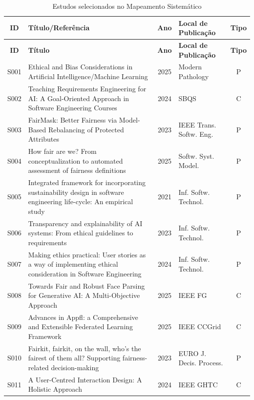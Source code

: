 \begin{longtable}
{|c|p{8cm}|c|p{3.5cm}|c|}
\caption{Estudos selecionados no Mapeamento Sistemático}
\label{estudos}\\
\hline
\textbf{ID} & \textbf{Título/Referência} & \textbf{Ano} & \textbf{Local de Publicação} & \textbf{Tipo} \\ \hline   
\endfirsthead
\hline
\textbf{ID} & \textbf{Título} & \textbf{Ano} & \textbf{Local de Publicação} & \textbf{Tipo} \\ \hline
\endhead
\hline
\endfoot
S001 & Ethical and Bias Considerations in Artificial Intelligence/Machine Learning \cite{S001} & 2025 & Modern Pathology & P \\ \hline
S002 & Teaching Requirements Engineering for AI: A Goal-Oriented Approach in Software Engineering Courses \cite{S002} & 2024 & SBQS & C \\ \hline
S003 & FairMask: Better Fairness via Model-Based Rebalancing of Protected Attributes \cite{S003} & 2023 & IEEE Trans. Softw. Eng. & P \\ \hline
S004 & How fair are we? From conceptualization to automated assessment of fairness definitions \cite{S004} & 2025 & Softw. Syst. Model. & P \\ \hline
S005 & Integrated framework for incorporating sustainability design in software engineering life-cycle: An empirical study \cite{S005} & 2021 & Inf. Softw. Technol. & P \\ \hline
S006 & Transparency and explainability of AI systems: From ethical guidelines to requirements \cite{S006} & 2023 & Inf. Softw. Technol. & P \\ \hline
S007 & Making ethics practical: User stories as a way of implementing ethical consideration in Software Engineering \cite{S007} & 2024 & Inf. Softw. Technol. & P \\ \hline
S008 & Towards Fair and Robust Face Parsing for Generative AI: A Multi-Objective Approach \cite{S008} & 2025 & IEEE FG & C \\ \hline
S009 & Advances in Appfl: a Comprehensive and Extensible Federated Learning Framework \cite{S009} & 2025 & IEEE CCGrid & C \\ \hline
S010 & Fairkit, fairkit, on the wall, who's the fairest of them all? Supporting fairness-related decision-making \cite{S010} & 2023 & EURO J. Decis. Process. & P \\ \hline
S011 & A User-Centred Interaction Design: A Holistic Approach \cite{S011} & 2024 & IEEE GHTC & C \\ \hline

\end{longtable}
